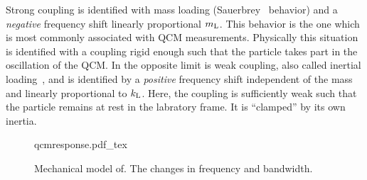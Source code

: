 Strong coupling is identified with mass loading
(Sauerbrey~\cite{sauerbrey1959verwendung} behavior) and a \textit{negative}
frequency shift linearly proportional $m_\mathrm{L}$.  This behavior is the one
which is most commonly associated with QCM measurements.  Physically this
situation is identified with a coupling rigid enough such that the particle
takes part in the oscillation of the QCM.  In the opposite limit is weak
coupling, also called inertial loading~\cite{dybwad1985sensitive}, and is
identified by a \textit{positive} frequency shift independent of the mass
and linearly proportional to $k_\mathrm{L}$.  Here, the coupling is sufficiently
weak such that the particle remains at rest in the labratory frame.  It is
``clamped'' by its own inertia.~\cite{du2008role}

\begin{figure}
\centering
{qcmresponse.pdf_tex}
\caption{Mechanical model of.  The changes in frequency and bandwidth.}
\label{fig:qcmresponse}
\end{figure}


